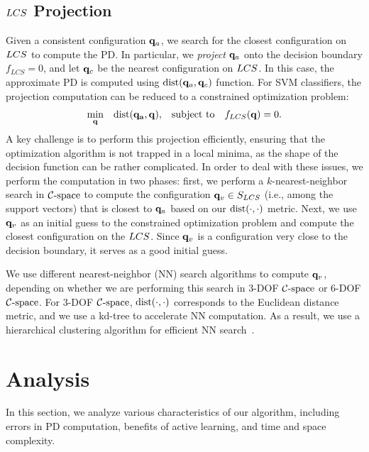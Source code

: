 \subsection{$LCS$ Projection}
Given a consistent configuration $\mathbf q_a$, we search for the closest configuration
on $LCS$ to compute the PD.  In particular,
we \emph{project} $\mathbf q_a$ onto the decision boundary $f_{LCS} = 0$, and let
$\mathbf q_c$ be the  nearest configuration on $LCS$. In this case, the approximate
PD is computed using $\operatorname{dist}(\mathbf q_a, \mathbf q_c)$ function.
For SVM classifiers, the projection computation can be reduced to a constrained
optimization problem:
\begin{equation}
\begin{aligned}
\label{eq:projection}
 & \underset{\mathbf q}{\text{min}} & \operatorname{dist}(\mathbf {\mathbf q_a}, \mathbf q), & & \text{subject to} & & f_{LCS}(\mathbf q) = 0.
\end{aligned}
\end{equation}
A key challenge is to perform this projection efficiently, ensuring that the optimization algorithm is not
trapped in a local minima, as the shape of the decision function can be rather complicated.
In order to deal with these issues, we perform the computation in two phases:
first, we perform a $k$-nearest-neighbor search in $\mathcal C\text{-space}$ to compute the configuration
$\mathbf q_v \in S_{LCS}$ (i.e., among the support vectors) that is closest to $\mathbf q_a$ based on our $\operatorname{dist}(\cdot, \cdot)$ metric. Next, we
use $\mathbf q_v$ as an initial guess to the constrained optimization problem and compute the closest configuration on the $LCS$.
Since $\mathbf q_v$ is a configuration very close to the decision boundary, it serves as a good initial guess.

We use different nearest-neighbor (NN)  search algorithms to compute $\mathbf q_v$, depending on whether we are
performing this search in 3-DOF $\mathcal C\text{-space}$ or 6-DOF $\mathcal C\text{-space}$. For 3-DOF $\mathcal C\text{-space}$, $\operatorname{dist}(\cdot, \cdot)$ corresponds to the Euclidean distance metric, and we use a kd-tree to accelerate NN computation. As a result, we use a hierarchical clustering algorithm for efficient NN search~\cite{Muja:2009:FAN}.



\section{Analysis}\label{sec:2:analysis}
In this section, we analyze various characteristics of our algorithm, including errors in PD computation, benefits of active learning, and time and space complexity.


